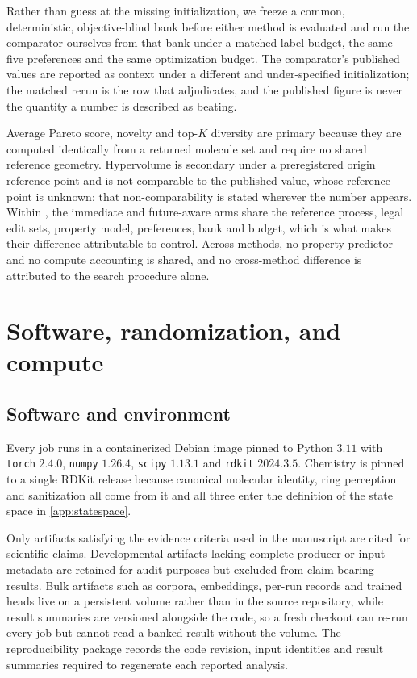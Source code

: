 Rather than guess at the missing initialization, we freeze a common, deterministic, objective-blind bank before either method is evaluated and run the comparator ourselves from that bank under a matched label budget, the same five preferences and the same optimization budget. The comparator's published values are reported as context under a different and under-specified initialization; the matched rerun is the row that adjudicates, and the published figure is never the quantity a \method{} number is described as beating.

Average Pareto score, novelty and top-$K$ diversity are primary because they are computed identically from a returned molecule set and require no shared reference geometry. Hypervolume is secondary under a preregistered origin reference point and is not comparable to the published value, whose reference point is unknown; that non-comparability is stated wherever the number appears. Within \method{}, the immediate and future-aware arms share the reference process, legal edit sets, property model, preferences, bank and budget, which is what makes their difference attributable to control. Across methods, no property predictor and no compute accounting is shared, and no cross-method difference is attributed to the search procedure alone.

\section{Software, randomization, and compute}
\label{app:repro}

\subsection{Software and environment}

Every job runs in a containerized Debian image pinned to Python $3.11$ with \texttt{torch} $2.4.0$, \texttt{numpy} $1.26.4$, \texttt{scipy} $1.13.1$ and \texttt{rdkit} $2024.3.5$. Chemistry is pinned to a single RDKit release because canonical molecular identity, ring perception and sanitization all come from it and all three enter the definition of the state space in \cref{app:statespace}.

Only artifacts satisfying the evidence criteria used in the manuscript are cited for scientific claims. Developmental artifacts lacking complete producer or input metadata are retained for audit purposes but excluded from claim-bearing results. Bulk artifacts such as corpora, embeddings, per-run records and trained heads live on a persistent volume rather than in the source repository, while result summaries are versioned alongside the code, so a fresh checkout can re-run every job but cannot read a banked result without the volume. The reproducibility package records the code revision, input identities and result summaries required to regenerate each reported analysis.

